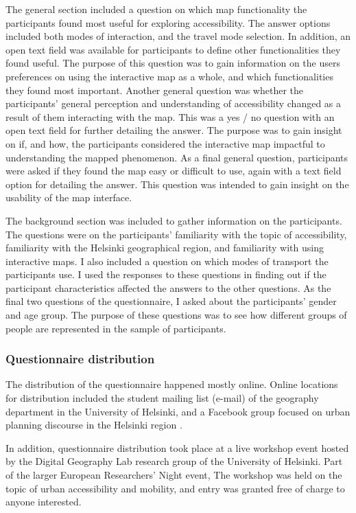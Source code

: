 The general section included a question on
which map functionality the participants found most useful for exploring accessibility.
The answer options included both modes of interaction, and the travel mode selection.
In addition, an open text field was available for participants to define
other functionalities they found useful.
The purpose of this question was to gain information on the users preferences on using
the interactive map as a whole, and which functionalities they found most important.
Another general question was whether
the participants' general perception and understanding of accessibility
changed as a result of them interacting with the map.
This was a yes / no question with an open text field for further detailing the answer.
The purpose was to gain insight on if, and how, the participants considered the
interactive map impactful to understanding the mapped phenomenon.
As a final general question, participants were asked if they found the map
easy or difficult to use, again with a text field option for detailing the answer.
This question was intended to gain insight on the usability of the map interface.

The background section was included to gather information on the participants.
The questions were on the participants' familiarity with the topic of accessibility,
familiarity with the Helsinki geographical region, and familiarity with using interactive maps.
I also included a question on which modes of transport the participants use.
I used the responses to these questions in finding out if the participant characteristics
affected the answers to the other questions.
As the final two questions of the questionnaire,
I asked about the participants' gender and age group.
The purpose of these questions was to see how
different groups of people are represented in the sample of participants.


\subsubsection{Questionnaire distribution}

The distribution of the questionnaire happened mostly online.
Online locations for distribution included the student mailing list (e-mail)
of the geography department in the University of Helsinki,
and a Facebook group focused on urban planning discourse in the Helsinki region
\parencite{lisaakaupunkiahki}.

In addition, questionnaire distribution took place at a live workshop event hosted by the
Digital Geography Lab research group of the University of Helsinki.
Part of the larger European Researchers' Night event,
The workshop was held on the topic of urban accessibility and mobility,
and entry was granted free of charge to anyone interested.

